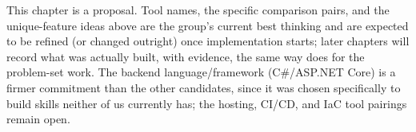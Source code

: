 \begin{devopsNote}[Status]
This chapter is a proposal. Tool names, the specific comparison pairs, and
the unique-feature ideas above are the group's current best thinking and are
expected to be refined (or changed outright) once implementation starts;
later chapters will record what was actually built, with evidence, the same
way  does for the problem-set work. The backend
language/framework (C\#/ASP.NET Core) is a firmer commitment than the other
candidates, since it was chosen specifically to build skills neither of us
currently has; the hosting, CI/CD, and IaC tool pairings remain open.
\end{devopsNote}
